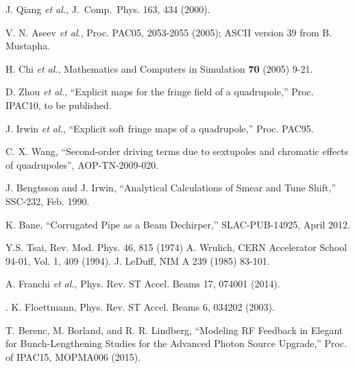 \documentclass[11pt]{article}
\begin{document}
\begin{thebibliography}{9}
J. Qiang {\em et al.},  J.~Comp.~Phys. 163, 434 (2000).

  V. N. Aseev {\em et al.}, Proc. PAC05, 2053-2055 (2005); ASCII version 39 from B. Mustapha.

  H. Chi {\em et al.}, Mathematics and Computers in Simulation {\bf 70} (2005) 9-21.

  D. Zhou {\em et al.}, ``Explicit maps for the fringe field of a quadrupole,'' Proc. IPAC10, to be published.

  J. Irwin {\em et al.}, ``Explicit soft fringe maps of a quadrupole,'' Proc. PAC95.

 C. X. Wang, ``Second-order driving terms due to sextupoles and chromatic effects of quadrupoles'', AOP-TN-2009-020.

  J. Bengtsson and J. Irwin, ``Analytical Calculations of Smear and Tune Shift,'' SSC-232, Feb. 1990.

 K. Bane, ``Corrugated Pipe as a Beam Dechirper,'' SLAC-PUB-14925, April 2012.

 Y.S. Tsai, Rev. Mod. Phys. 46, 815 (1974)
 A. Wrulich, CERN Accelerator School 94-01, Vol. 1, 409 (1994).
 J. LeDuff, NIM A 239 (1985) 83-101.

 A. Franchi {\em et al.}, Phys. Rev. ST Accel. Beams 17, 074001 (2014).

.
 K. Floettmann, Phys. Rev. ST Accel. Beams 6, 034202 (2003).

 T. Berenc, M. Borland, and R. R. Lindberg, ``Modeling RF Feedback in Elegant for Bunch-Lengthening Studies for the Advanced Photon Source Upgrade,''
 Proc. of IPAC15, MOPMA006 (2015).

\end{thebibliography}
\end{document}
